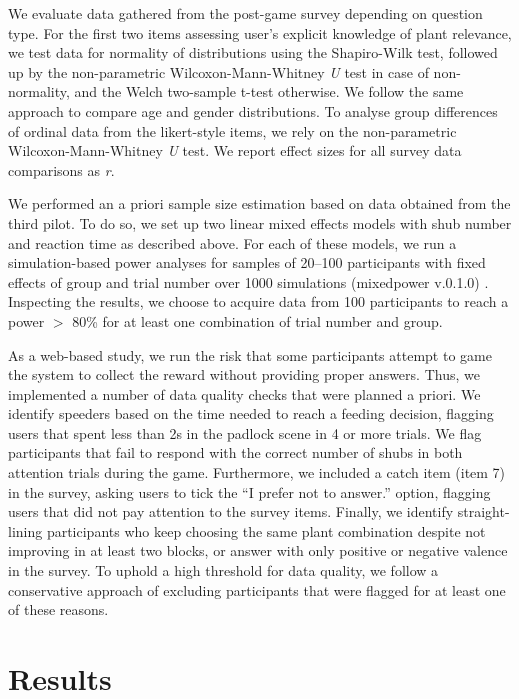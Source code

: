 We evaluate data gathered from the post-game survey depending on question type.
For the first two items assessing user's explicit knowledge of plant relevance, we test data for normality of distributions using the Shapiro-Wilk test, followed up by the non-parametric Wilcoxon-Mann-Whitney \textit{U} test in case of non-normality, and the Welch two-sample t-test otherwise. 
We follow the same approach to compare age and gender distributions.
To analyse group differences of ordinal data from the likert-style items, we rely on the non-parametric Wilcoxon-Mann-Whitney \textit{U} test.
We report effect sizes for all survey data comparisons as \textit{r}.

We performed an a priori sample size estimation based on data obtained from the third pilot. 
To do so, we set up two linear mixed effects models with shub number and reaction time as described above. 
For each of these models, we run a simulation-based power analyses for samples of 20--100 participants with fixed effects of group and trial number over 1000 simulations (mixedpower v.0.1.0) \citep{kumle_estimating_2021}. 
Inspecting the results, we choose to acquire data from 100 participants to reach a power $>$ 80\% for at least one combination of trial number and group.

As a web-based study, we run the risk that some participants attempt to game the system to collect the reward without providing proper answers. 
Thus, we implemented a number of data quality checks that were planned a priori.
We identify speeders based on the time needed to reach a feeding decision, flagging users that spent less than 2s in the padlock scene in 4 or more trials.
We flag participants that fail to respond with the correct number of shubs in both attention trials during the game.
Furthermore, we included a catch item (item 7) in the survey, asking users to tick the ``I prefer not to answer.'' option, flagging users that did not pay attention to the survey items.
Finally, we identify straight-lining participants who keep choosing the same plant combination despite not improving in at least two blocks, or answer with only positive or negative valence in the survey.
To uphold a high threshold for data quality, we follow a conservative approach of excluding participants that were flagged for at least one of these reasons.

\section{Results}\label{sec:results}

